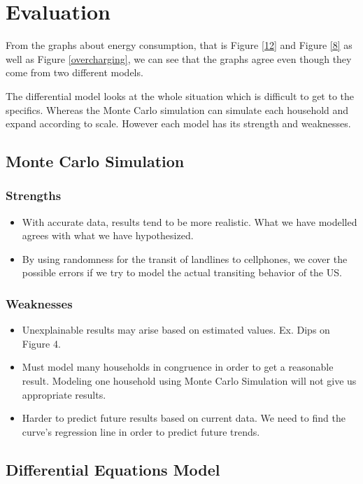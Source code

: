 \documentclass{article}
\begin{document}
\section{Evaluation}

From the graphs about energy consumption, that is Figure \ref{12} and Figure \ref{8} as well as Figure \ref{overcharging}, we can see that the graphs agree even though they come from two different models.\par 
The differential model looks at the whole situation which is difficult to get to the specifics. Whereas the Monte Carlo simulation can simulate each household and expand according to scale. However each model has its strength and weaknesses. 

\subsection{Monte Carlo Simulation}
\subsubsection{Strengths}
\begin{itemize}
    \item With accurate data, results tend to be more realistic. What we have modelled agrees with what we have hypothesized.
    \item By using randomness for the transit of landlines to cellphones, we cover the possible errors if we try to model the actual transiting behavior of the US.
\end{itemize}
\subsubsection{Weaknesses}
\begin{itemize}
    \item Unexplainable results may arise based on estimated values. Ex. Dips on Figure 4.
    \item Must model many households in congruence in order to get a reasonable result. Modeling one household using Monte Carlo Simulation will not give us appropriate results.
    \item Harder to predict future results based on current data. We need to find the curve's regression line in order to predict future trends.
\end{itemize}
\subsection{Differential Equations Model}
\end{document}
